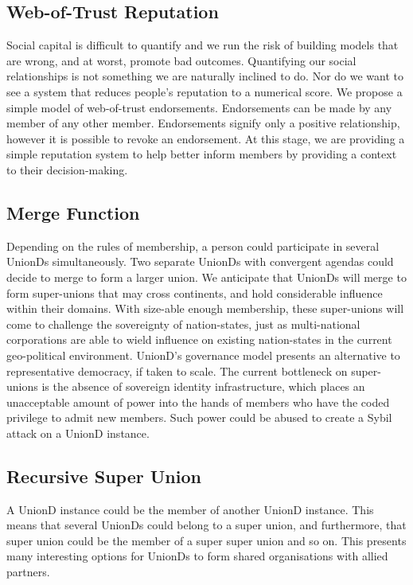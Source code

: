 \documentclass[12pt,twocolumn]{article}
\begin{document}
\subsection {Web-of-Trust Reputation}

Social capital is difficult to quantify and we run the risk of building models that are wrong, and at worst, promote bad outcomes. Quantifying our social relationships is not something we are naturally inclined to do. Nor do we want to see a system that reduces people's reputation to a numerical score. We propose a simple model of web-of-trust endorsements. Endorsements can be made by any member of any other member. Endorsements signify only a positive relationship, however it is possible to revoke an endorsement. At this stage, we are providing a simple reputation system to help better inform members by providing a context to their decision-making. 

\subsection {Merge Function}

Depending on the rules of membership, a person could participate in several UnionDs simultaneously. Two separate UnionDs with convergent agendas could decide to merge to form a larger union. We anticipate that UnionDs will merge to form super-unions that may cross continents, and hold considerable influence within their domains. With size-able enough membership, these super-unions will come to challenge the sovereignty of nation-states, just as multi-national corporations are able to wield influence on existing nation-states in the current geo-political environment. UnionD's governance model presents an alternative to representative democracy, if taken to scale. The current bottleneck on super-unions is the absence of sovereign identity infrastructure, which places an unacceptable amount of power into the hands of members who have the coded privilege to admit new members. Such power could be abused to create a Sybil attack on a UnionD instance.


\subsection {Recursive Super Union}

A UnionD instance could be the member of another UnionD instance. This means that several UnionDs could belong to a super union, and furthermore, that super union could be the member of a super super union and so on. This presents many interesting options for UnionDs to form shared organisations with allied partners.
\end{document}
